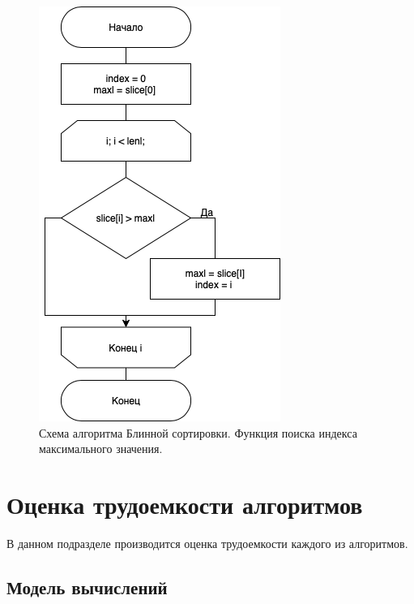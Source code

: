 \begin{figure}[h]
    \centering
    \includegraphics[width=0.4\linewidth]{img/pancake3.png}
    \caption{Схема алгоритма Блинной сортировки. Функция поиска индекса максимального значения.}
\end{figure}

\clearpage
\section{Оценка трудоемкости алгоритмов}

В данном подразделе производится оценка трудоемкости каждого из алгоритмов.

\subsection{Модель вычислений}

